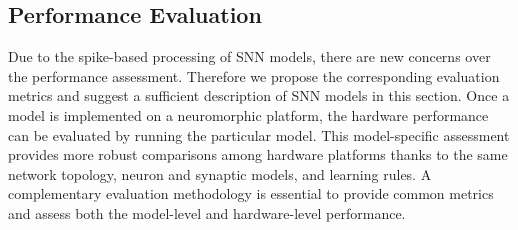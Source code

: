 \documentclass{frontiersENG} %
\begin{document}
\subsection{Performance Evaluation}
\label{sec:eval}
Due to the spike-based processing of SNN models, there are new concerns over the performance assessment.
Therefore we propose the corresponding evaluation metrics and suggest a sufficient description of SNN models in this section.
Once a model is implemented on a neuromorphic platform, the hardware performance can be evaluated by running the particular model.
This model-specific assessment provides more robust comparisons among hardware platforms thanks to the same network topology, neuron and synaptic models, and learning rules. 
A complementary evaluation methodology is essential to provide common metrics and assess both the model-level and hardware-level performance.
\end{document}
